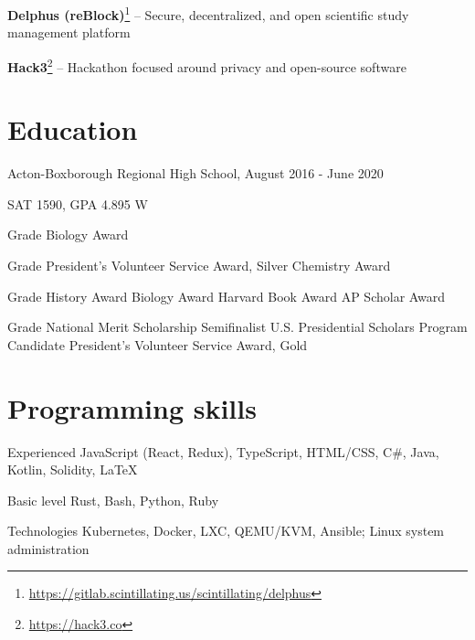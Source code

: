 \documentclass[paper=letter]{tccv}
\begin{document}
\textbf{Delphus (reBlock)}\footnote{\url{https://gitlab.scintillating.us/scintillating/delphus}} -- Secure, decentralized, and open scientific study management platform

\textbf{Hack3}\footnote{\url{https://hack3.co}} -- Hackathon focused around privacy and open-source software

\textbf{}

\section{Education}

Acton-Boxborough Regional High School, August 2016 - June 2020

SAT 1590, GPA 4.895 W

\begin{yearlist}

\item{ Grade}
     {Biology Award}
     {}

\item{ Grade}
     {President's Volunteer Service Award, Silver\newline
     Chemistry Award}
     {}

\item{ Grade}
    {History Award\newline
     Biology Award\newline
     Harvard Book Award\newline
     AP Scholar Award}
     {}

\item{ Grade}
    {National Merit Scholarship Semifinalist\newline
    U.S. Presidential Scholars Program Candidate\newline
    President's Volunteer Service Award, Gold}
     {}

\end{yearlist}

\section{Programming skills}

\begin{factlist}

\item{Experienced}
     {JavaScript (React, Redux), TypeScript, HTML/CSS, C\#, Java, Kotlin, Solidity, \LaTeX}

\item{Basic level}
     {Rust, Bash, Python, Ruby}

\item{Technologies}
     {Kubernetes, Docker, LXC, QEMU/KVM, Ansible; Linux system administration}

\end{factlist}
\end{document}
